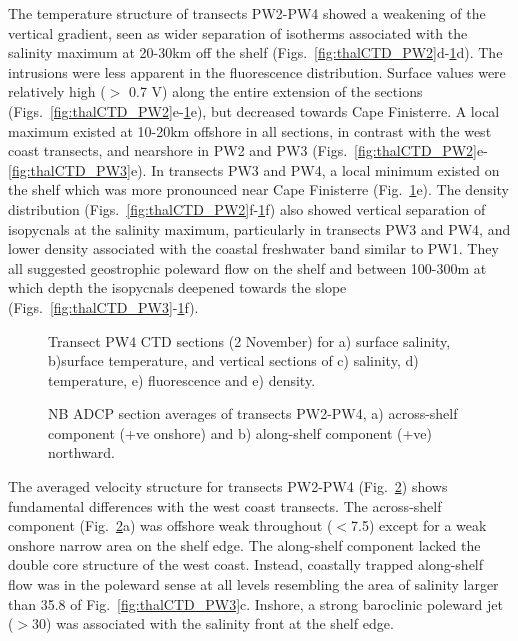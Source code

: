 The temperature structure of transects PW2-PW4 showed a weakening
of the vertical gradient, seen as wider separation of isotherms
associated with the salinity maximum at 20-30km off the shelf
(Figs.~\ref{fig:thalCTD_PW2}d-\ref{fig:thalCTD_PW4}d). The
intrusions were less apparent in the fluorescence distribution.
Surface values were relatively high ($>$ 0.7 V) along the entire
extension of the sections
(Figs.~\ref{fig:thalCTD_PW2}e-\ref{fig:thalCTD_PW4}e), but
decreased towards Cape Finisterre. A local maximum existed at
10-20km offshore in all sections, in contrast with the west coast
transects, and nearshore in PW2 and PW3
(Figs.~\ref{fig:thalCTD_PW2}e-\ref{fig:thalCTD_PW3}e). In
transects PW3 and PW4, a local minimum existed on the shelf which
was more pronounced near Cape Finisterre
(Fig.~\ref{fig:thalCTD_PW4}e). The density distribution
(Figs.~\ref{fig:thalCTD_PW2}f-\ref{fig:thalCTD_PW4}f) also showed
vertical separation of isopycnals at the salinity maximum,
particularly in transects PW3 and PW4, and lower density
associated with the coastal freshwater band similar to PW1. They
all suggested geostrophic poleward flow on the shelf and between
100-300m at which depth the isopycnals deepened towards the slope
(Figs.~\ref{fig:thalCTD_PW3}-\ref{fig:thalCTD_PW4}f).

\begin{figure}[t]
\arribacap \centering %
\hspace{0.2cm}
\quad%
\subfigure[]{\texttt{[image: PW3\_S]}}%
\subfigure[]{\texttt{[image: PW3\_T]}}\quad%
\subfigure[]{\texttt{[image: PW3\_F]}}%
\subfigure[]{\texttt{[image: PW3\_D]}}%
\caption{Transect PW4 CTD sections (2 November)  for a) surface
salinity, b)surface temperature, and vertical sections of c)
salinity, d) temperature, e) fluorescence and e) density.}
\label{fig:thalCTD_PW4}
\end{figure}

\begin{figure}[t]
\arribacap \centering %
%
\quad%
\caption{NB ADCP section averages of transects PW2-PW4,  a)
across-shelf component (+ve onshore) and b) along-shelf component
(+ve) northward.} \label{fig:thalADCP_PW24}
\end{figure}

The averaged velocity structure for transects PW2-PW4
(Fig.~\ref{fig:thalADCP_PW24}) shows fundamental differences with
the west coast transects. The across-shelf component
(Fig.~\ref{fig:thalADCP_PW24}a) was offshore weak throughout
($<$7.5\velc) except for a weak onshore narrow area on the shelf
edge. The along-shelf component lacked the double core structure
of the west coast. Instead, coastally trapped along-shelf flow was
in the poleward sense at all levels resembling the area of
salinity larger than 35.8 of Fig.~\ref{fig:thalCTD_PW3}c. Inshore,
a strong baroclinic poleward jet ($>$30\velc) was associated with
the salinity front at the shelf edge.


